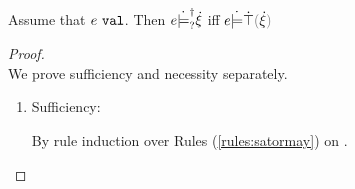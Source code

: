\begin{lemma}
  \label{lem:val-satisfy-truify}
  Assume that $e ~\mathtt{val}$. Then $e \dot{\models}_{?}^{\dag} \dot{\xi}$ iff $\csatisfy{e}{\ctruify{\hxi}}$
\end{lemma}
\begin{proof}\mbox{}\\
  We prove sufficiency and necessity separately.
  \begin{enumerate}
    \item Sufficiency:
      By rule induction over Rules (\ref{rules:satormay}) on .
      \begin{byCases}


\end{byCases}
\end{enumerate}
\end{proof}
